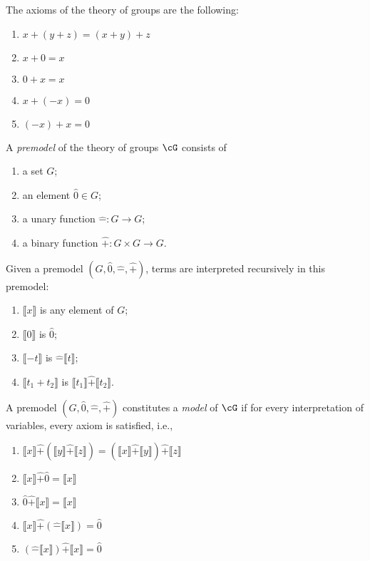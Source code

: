 \documentclass{amsart}
\newcommand{\interp}[1]{\llbracket #1 \rrbracket}
\begin{document}
The axioms of the theory of groups are the following:
\begin{enumerate}
\item $x + (y + z) = (x + y) + z$
\item $x + 0 = x$
\item $0 + x = x$
\item $x + (-x) = 0$
\item $(-x) + x = 0$
\end{enumerate}

\begin{defn}
  A \emph{premodel} of the theory of groups $\cG$ consists of
  \begin{enumerate}
  \item a set $G$;
  \item an element $\hat{0} \in G$;
  \item a unary function $\hat{-} : G \to G$;
  \item a binary function $\hat{+} : G \times G \to G$.
  \end{enumerate}
\end{defn}

Given a premodel $(G, \hat{0}, \hat{-}, \hat{+})$, terms are interpreted recursively in this premodel:
\begin{enumerate}
\item $\interp{x}$ is any element of $G$;
\item $\interp{0}$ is $\hat{0}$;
\item $\interp{-t}$ is $\hat{-}\interp{t}$;
\item $\interp{t_{1} + t_{2}}$ is $\interp{t_{1}} \hat{+} \interp{t_{2}}$.
\end{enumerate}

\begin{defn}
  A premodel $(G, \hat{0}, \hat{-}, \hat{+})$ constitutes a \emph{model} of $\cG$ if for every interpretation of variables, every axiom is satisfied, i.e.,
  \begin{enumerate}
  \item $\interp{x} \hat{+} (\interp{y} \hat{+} \interp{z}) = (\interp{x} \hat{+} \interp{y}) \hat{+} \interp{z}$
  \item $\interp{x} \hat{+} \hat{0} = \interp{x}$
  \item $\hat{0} \hat{+} \interp{x} = \interp{x}$
  \item $\interp{x} \hat{+} (\hat{-}\interp{x}) = \hat{0}$
  \item $(\hat{-}\interp{x}) \hat{+} \interp{x} = \hat{0}$
  \end{enumerate}
\end{defn}
\end{document}
